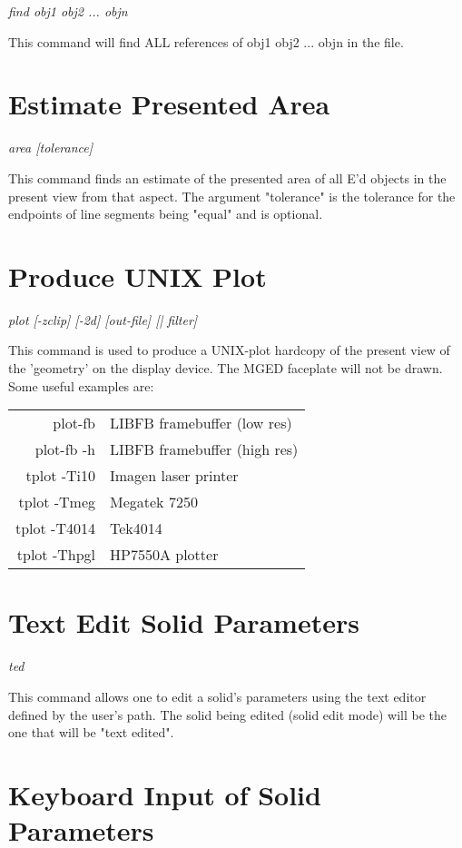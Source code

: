 {\em \center
find obj1 obj2 ... objn
}

This command will find ALL references of obj1 obj2 ... objn in the file.

\section{Estimate Presented Area}

{\em \center
area [tolerance]
}

This command finds an estimate of the presented area of all E'd objects
in the present view from that aspect.
The argument "tolerance" is the tolerance for the endpoints of
line segments being "equal" and is optional.

\section{Produce UNIX Plot}

{\em \center
plot [-zclip] [-2d] [out-file] [| filter]
}

This command is used to produce a UNIX-plot hardcopy of the present view of
the 'geometry' on the display device.
The MGED faceplate will not be drawn.
Some useful examples are:

\begin{tabular}{rl}
plot-fb & LIBFB framebuffer (low res) \\
plot-fb -h & LIBFB framebuffer (high res) \\
tplot -Ti10 & Imagen laser printer \\
tplot -Tmeg & Megatek 7250 \\
tplot -T4014 & Tek4014 \\
tplot -Thpgl & HP7550A plotter
\end{tabular}

\section{Text Edit Solid Parameters}

{\em \center
ted
}

This command allows one to edit a solid's parameters using the text editor
defined by the user's path.
The solid being edited (solid edit mode) will be the one that will be
"text edited".

\section{Keyboard Input of Solid Parameters}

